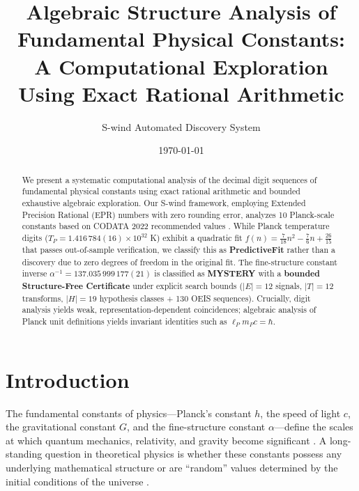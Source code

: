 \documentclass[twocolumn,showpacs,preprintnumbers,amsmath,amssymb,prl]{revtex4-2}
\begin{document}
\title{Algebraic Structure Analysis of Fundamental Physical Constants:\\
A Computational Exploration Using Exact Rational Arithmetic}

\author{S-wind Automated Discovery System}

\date{\today}

\begin{abstract}
We present a systematic computational analysis of the decimal digit sequences of fundamental physical constants using exact rational arithmetic and bounded exhaustive algebraic exploration. Our S-wind framework, employing Extended Precision Rational (EPR) numbers with zero rounding error, analyzes 10 Planck-scale constants based on CODATA 2022 recommended values \cite{codata2022}. While Planck temperature digits ($T_P = 1.416\,784(16) \times 10^{32}$ K) exhibit a quadratic fit $f(n) = \frac{7}{18}n^2 - \frac{7}{6}n + \frac{26}{15}$ that passes out-of-sample verification, we classify this as \textbf{PredictiveFit} rather than a discovery due to zero degrees of freedom in the original fit. The fine-structure constant inverse $\alpha^{-1} = 137.035\,999\,177(21)$ is classified as \textbf{MYSTERY} with a \textbf{bounded Structure-Free Certificate} under explicit search bounds ($|E| = 12$ signals, $|T| = 12$ transforms, $|H| = 19$ hypothesis classes + 130 OEIS sequences). Crucially, digit analysis yields weak, representation-dependent coincidences; algebraic analysis of Planck unit definitions yields invariant identities such as $\ell_P m_P c = \hbar$.
\end{abstract}


\maketitle

\section{Introduction}

The fundamental constants of physics---Planck's constant $h$, the speed of light $c$, the gravitational constant $G$, and the fine-structure constant $\alpha$---define the scales at which quantum mechanics, relativity, and gravity become significant \cite{planck1900,dirac1937}. A long-standing question in theoretical physics is whether these constants possess any underlying mathematical structure or are ``random'' values determined by the initial conditions of the universe \cite{barrow2002}.
\end{document}
